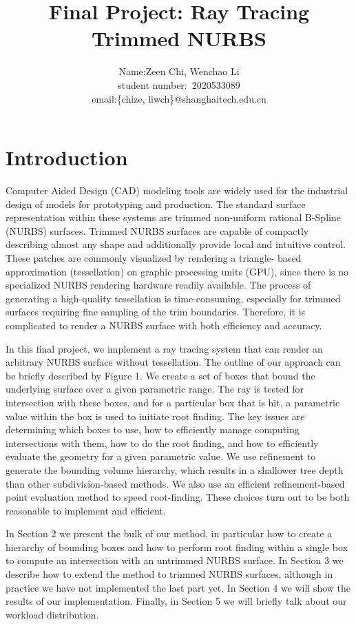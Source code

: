 \documentclass[acmtog]{acmart}
\title{Final Project: {Ray Tracing Trimmed NURBS}}
\author{Name:\quad Zeen Chi, Wenchao Li  \\ student number:\ 2020533089
\\email:\quad \{chize, liwch\}@shanghaitech.edu.cn}
\begin{document}
\maketitle

\vspace*{2 ex}

\section{Introduction}
\hspace*{8pt}
Computer Aided Design (CAD) modeling tools are widely used for the industrial design of models for prototyping and production. The standard surface representation within these systems are trimmed non-uniform rational B-Spline (NURBS) surfaces. Trimmed NURBS surfaces are capable of compactly describing almost any shape and additionally provide local and intuitive control. These patches are commonly visualized by rendering a triangle- based approximation (tessellation) on graphic processing units (GPU), since there is no specialized NURBS rendering hardware readily available. The process of generating a high-quality tessellation is time-consuming, especially for trimmed surfaces requiring fine sampling of the trim boundaries. Therefore, it is complicated to render a NURBS surface with both efficiency and accuracy.

In this final project, we implement a ray tracing system that can render an arbitrary NURBS surface without tessellation. The outline of our approach can be briefly described by Figure 1. We create a set of boxes that bound the underlying surface over a given parametric range. The ray is tested for intersection with these boxes, and for a particular box that is hit, a parametric value within the box is used to initiate root finding. The key issues are determining which boxes to use, how to efficiently manage computing intersections with them, how to do the root finding, and how to efficiently evaluate the geometry for a given parametric value.
We use refinement to generate the bounding volume hierarchy, which results in a shallower tree depth than other subdivision-based methods. We also use an efficient refinement-based point evaluation method to speed root-finding. These choices turn out to be both reasonable to implement and efficient.

In Section 2 we present the bulk of our method, in particular how to create a hierarchy of bounding boxes and how to perform root finding within a single box to compute an intersection with an untrimmed NURBS surface. In Section 3 we describe how to extend the method to trimmed NURBS surfaces, although in practice we have not implemented the last part yet. In Section 4 we will show the results of our implementation. Finally, in Section 5 we will briefly talk about our workload distribution.
\end{document}
